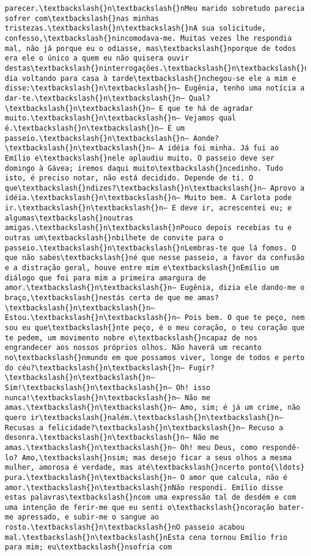 \begin{Verbatim}[commandchars=\\\{\}]
parecer.\textbackslash{}n\textbackslash{}nMeu marido sobretudo parecia sofrer com\textbackslash{}nas minhas tristezas.\textbackslash{}n\textbackslash{}nA sua solicitude, confesso,\textbackslash{}nincomodava-me. Muitas vezes lhe respondia mal, não já porque eu o odiasse, mas\textbackslash{}nporque de todos era ele o único a quem eu não quisera ouvir destas\textbackslash{}ninterrogações.\textbackslash{}n\textbackslash{}nUm dia voltando para casa à tarde\textbackslash{}nchegou-se ele a mim e disse:\textbackslash{}n\textbackslash{}n— Eugênia, tenho uma notícia a dar-te.\textbackslash{}n\textbackslash{}n— Qual?\textbackslash{}n\textbackslash{}n— E que te há de agradar muito.\textbackslash{}n\textbackslash{}n— Vejamos qual é.\textbackslash{}n\textbackslash{}n— É um passeio.\textbackslash{}n\textbackslash{}n— Aonde?\textbackslash{}n\textbackslash{}n— A idéia foi minha. Já fui ao Emílio e\textbackslash{}nele aplaudiu muito. O passeio deve ser domingo à Gávea; iremos daqui muito\textbackslash{}ncedinho. Tudo isto, é preciso notar, não está decidido. Depende de ti. O que\textbackslash{}ndizes?\textbackslash{}n\textbackslash{}n— Aprovo a idéia.\textbackslash{}n\textbackslash{}n— Muito bem. A Carlota pode ir.\textbackslash{}n\textbackslash{}n— E deve ir, acrescentei eu; e algumas\textbackslash{}noutras amigas.\textbackslash{}n\textbackslash{}nPouco depois recebias tu e outras um\textbackslash{}nbilhete de convite para o passeio.\textbackslash{}n\textbackslash{}nLembras-te que lá fomos. O que não sabes\textbackslash{}né que nesse passeio, a favor da confusão e a distração geral, houve entre mim e\textbackslash{}nEmílio um diálogo que foi para mim a primeira amargura de amor.\textbackslash{}n\textbackslash{}n— Eugênia, dizia ele dando-me o braço,\textbackslash{}nestás certa de que me amas?\textbackslash{}n\textbackslash{}n— Estou.\textbackslash{}n\textbackslash{}n— Pois bem. O que te peço, nem sou eu que\textbackslash{}nte peço, é o meu coração, o teu coração que te pedem, um movimento nobre e\textbackslash{}ncapaz de nos engrandecer aos nossos próprios olhos. Não haverá um recanto no\textbackslash{}nmundo em que possamos viver, longe de todos e perto do céu?\textbackslash{}n\textbackslash{}n— Fugir?\textbackslash{}n\textbackslash{}n— Sim!\textbackslash{}n\textbackslash{}n— Oh! isso nunca!\textbackslash{}n\textbackslash{}n— Não me amas.\textbackslash{}n\textbackslash{}n— Amo, sim; é já um crime, não quero ir\textbackslash{}nalém.\textbackslash{}n\textbackslash{}n— Recusas a felicidade?\textbackslash{}n\textbackslash{}n— Recuso a desonra.\textbackslash{}n\textbackslash{}n— Não me amas.\textbackslash{}n\textbackslash{}n— Oh! meu Deus, como respondê-lo? Amo,\textbackslash{}nsim; mas desejo ficar a seus olhos a mesma mulher, amorosa é verdade, mas até\textbackslash{}ncerto ponto{\ldots} pura.\textbackslash{}n\textbackslash{}n— O amor que calcula, não é amor.\textbackslash{}n\textbackslash{}nNão respondi. Emílio disse estas palavras\textbackslash{}ncom uma expressão tal de desdém e com uma intenção de ferir-me que eu senti o\textbackslash{}ncoração bater-me apressado, e subir-me o sangue ao rosto.\textbackslash{}n\textbackslash{}nO passeio acabou mal.\textbackslash{}n\textbackslash{}nEsta cena tornou Emílio frio para mim; eu\textbackslash{}nsofria com 
\end{Verbatim}
